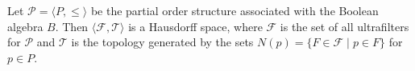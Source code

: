 Let $\mathcal{P} = \langle P, \leq \rangle$ be the partial order structure associated with the Boolean algebra $B$. Then $\langle \mathcal{F}, \mathcal{T} \rangle$ is a Hausdorff space, where $\mathcal{F}$ is the set of all ultrafilters for $\mathcal{P}$ and $\mathcal{T}$ is the topology generated by the sets $N(p) = \{F \in \mathcal{F} \mid p \in F\}$ for $p \in P$.
